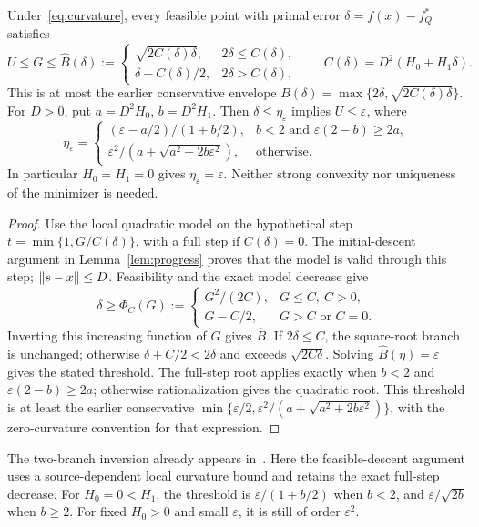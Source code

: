 \begin{lemma}\label{lem:awaybridge}
Under~\eqref{eq:curvature}, every feasible point with primal error
$\delta=f(x)-f_Q^*$ satisfies
\[
 U\le G\le\widehat B(\delta):=
 \begin{cases}
 \sqrt{2C(\delta)\delta},&2\delta\le C(\delta),\\
 \delta+C(\delta)/2,&2\delta>C(\delta),
 \end{cases}
 \qquad C(\delta)=D^2(H_0+H_1\delta).
\]
This is at most the earlier conservative envelope
$B(\delta)=\max\{2\delta,\sqrt{2C(\delta)\delta}\}$.
For $D>0$, put $a=D^2H_0$, $b=D^2H_1$.
Then $\delta\le\eta_\varepsilon$ implies $U\le\varepsilon$, where
\[
 \eta_\varepsilon=
 \begin{cases}
 (\varepsilon-a/2)/(1+b/2),& b<2\text{ and }\varepsilon(2-b)\ge2a,\\[2pt]
 \varepsilon^2/(a+\sqrt{a^2+2b\varepsilon^2}),&\text{otherwise}.
 \end{cases}
\]
In particular $H_0=H_1=0$ gives $\eta_\varepsilon=\varepsilon$.
Neither strong convexity nor uniqueness of the minimizer is needed.
\end{lemma}
\begin{proof}
Use the local quadratic model on the hypothetical step
$t=\min\{1,G/C(\delta)\}$, with a full step if $C(\delta)=0$.
The initial-descent argument in Lemma~\ref{lem:progress} proves that
the model is valid through this step; $\left\|s-x\right\|\le D$.
Feasibility and the exact model decrease give
\[
 \delta\ge\Phi_C(G):=
 \begin{cases}G^2/(2C),&G\le C,\ C>0,\\
 G-C/2,&G>C\text{ or }C=0.
 \end{cases}
\]
Inverting this increasing function of $G$ gives $\widehat B$.
If $2\delta\le C$, the square-root branch is unchanged; otherwise
$\delta+C/2<2\delta$ and exceeds $\sqrt{2C\delta}$.
Solving $\widehat B(\eta)=\varepsilon$ gives the stated threshold.
The full-step root applies exactly when $b<2$ and
$\varepsilon(2-b)\ge2a$; otherwise rationalization gives the
quadratic root. This threshold is at least the earlier conservative
$\min\{\varepsilon/2,\varepsilon^2/(a+\sqrt{a^2+2b\varepsilon^2})\}$,
with the zero-curvature convention for that expression.
\end{proof}
The two-branch inversion already appears in~\cite[Eq.~(15)]{lacoste2016}.
Here the feasible-descent argument uses a source-dependent local
curvature bound and retains the exact full-step decrease.
For $H_0=0<H_1$, the threshold is
$\varepsilon/(1+b/2)$ when $b<2$, and
$\varepsilon/\sqrt{2b}$ when $b\ge2$. For fixed $H_0>0$ and small
$\varepsilon$, it is still of order $\varepsilon^2$.

